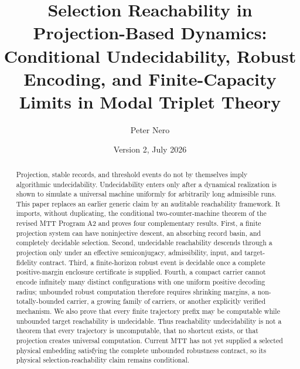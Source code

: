 \documentclass[11pt]{article}
\title{\textbf{Selection Reachability in Projection-Based Dynamics:}\\
\large Conditional Undecidability, Robust Encoding, and Finite-Capacity
Limits in Modal Triplet Theory}
\author{Peter Nero}
\date{Version 2, July 2026}
\theoremstyle{definition}
\theoremstyle{remark}
\begin{document}
\maketitle

\begin{abstract}
Projection, stable records, and threshold events do not by themselves imply
algorithmic undecidability.  Undecidability enters only after a dynamical
realization is shown to simulate a universal machine uniformly for arbitrarily
long admissible runs.  This paper replaces an earlier generic claim by an
auditable reachability framework.  It imports, without duplicating, the
conditional two-counter-machine theorem of the revised MTT Program A2 and
proves four complementary results.  First, a finite projection system can have
noninjective descent, an absorbing record basin, and completely decidable
selection.  Second, undecidable reachability descends through a projection only
under an effective semiconjugacy, admissibility, input, and target-fidelity
contract.  Third, a finite-horizon robust event is decidable once a complete
positive-margin enclosure certificate is supplied.  Fourth, a compact carrier
cannot encode infinitely many distinct configurations with one uniform
positive decoding radius; unbounded robust computation therefore requires
shrinking margins, a non-totally-bounded carrier, a growing family of carriers,
or another explicitly verified mechanism.  We also prove that every finite
trajectory prefix may be computable while unbounded target reachability is
undecidable.  Thus reachability undecidability is not a theorem that every
trajectory is uncomputable, that no shortcut exists, or that projection creates
universal computation.  Current MTT has not yet supplied a selected physical
embedding satisfying the complete unbounded robustness contract, so its
physical selection-reachability claim remains conditional.
\end{abstract}
\end{document}
